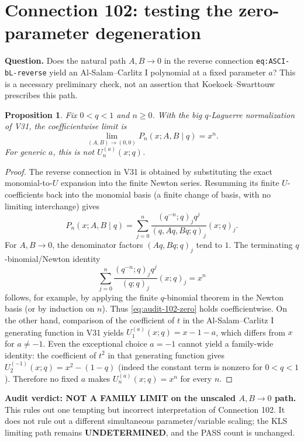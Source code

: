 \documentclass[11pt]{article}
\newtheorem{proposition}{Proposition}
\begin{document}
\section{Connection 102: testing the zero-parameter degeneration}
\noindent\textbf{Question.} Does the natural path $A,B\to0$ in the reverse connection
\texttt{eq:ASCI-bL-reverse} yield an Al-Salam--Carlitz I polynomial at a
fixed parameter $a$? This is a necessary preliminary check, not an assertion
that Koekoek--Swarttouw prescribes this path.

\begin{proposition}
Fix $0<q<1$ and $n\ge0$. With the big $q$-Laguerre normalization
of V31, the coefficientwise limit is
\begin{equation}\label{eq:audit-102-zero}
\lim_{(A,B)\to(0,0)}P_n(x;A,B\mid q)=x^n.
\end{equation}
For generic $a$, this is \emph{not} $U_n^{(a)}(x;q)$.
\end{proposition}
\begin{proof}
The reverse connection in V31 is obtained by substituting the exact
monomial-to-$U$ expansion into the finite Newton series. Resumming its
finite $U$-coefficients back into the monomial basis (a finite change
of basis, with no limiting interchange) gives
\[
P_n(x;A,B\mid q)=\sum_{j=0}^n
\frac{(q^{-n};q)_j q^j}{(q,Aq,Bq;q)_j}(x;q)_j.
\]
For $A,B\to0$, the denominator factors $(Aq,Bq;q)_j$ tend to $1$.
The terminating $q$-binomial/Newton identity
\[
\sum_{j=0}^n\frac{(q^{-n};q)_j q^j}{(q;q)_j}(x;q)_j=x^n
\]
follows, for example, by applying the finite $q$-binomial theorem
in the Newton basis (or by induction on $n$). Thus
\eqref{eq:audit-102-zero} holds coefficientwise. On the other hand,
comparison of the coefficient of $t$ in the Al-Salam--Carlitz I
generating function in V31 yields
$U_1^{(a)}(x;q)=x-1-a$, which differs from $x$ for $a\ne-1$.
Even the exceptional choice $a=-1$ cannot yield a family-wide
identity: the coefficient of $t^2$ in that generating function gives
$U_2^{(-1)}(x;q)=x^2-(1-q)$ (indeed the constant term is nonzero
for $0<q<1$). Therefore no fixed $a$ makes
$U_n^{(a)}(x;q)=x^n$ for every $n$.
\end{proof}
\noindent\textbf{Audit verdict: NOT A FAMILY LIMIT on the unscaled
$A,B\to0$ path.} This rules out one tempting but incorrect
interpretation of Connection 102. It does not rule out a different
simultaneous parameter/variable scaling; the KLS limiting path
remains \textbf{UNDETERMINED}, and the PASS count is unchanged.
\end{document}
